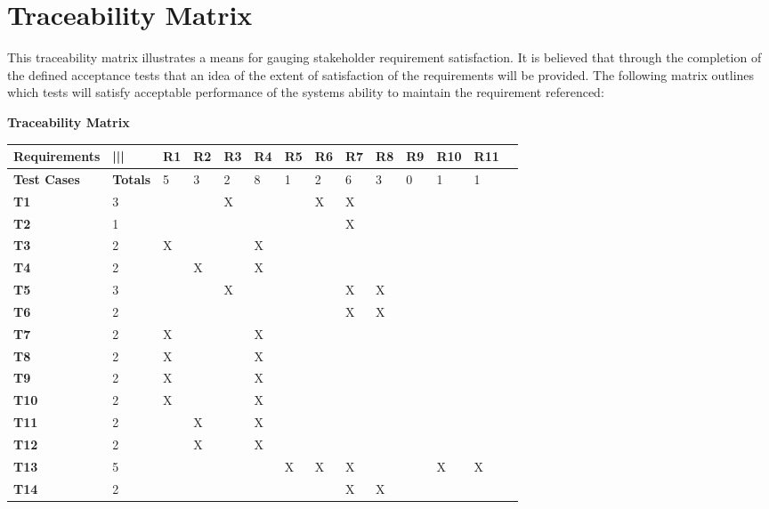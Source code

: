 \documentclass{article}
\begin{document}
\pagebreak
\section{Traceability Matrix}
This traceability matrix illustrates a means for gauging stakeholder requirement satisfaction. It is believed that through the completion of the defined acceptance tests that an idea of the extent of satisfaction of the requirements will be provided. The following matrix outlines which tests will satisfy acceptable performance of the systems ability to maintain the requirement referenced:

\begin{flushleft}
\large
{}
\textbf{Traceability Matrix}
\end{flushleft}

\begin{center}
\begin{tabular}{|l|l|l|l|l|l|l|l|l|l|l|l|l|l|}
\hline
 \textbf{Requirements} & ||| & \textbf{R1} & \textbf{R2}  & \textbf{R3} & \textbf{R4} & \textbf{R5} & \textbf{R6}  & \textbf{R7} & \textbf{R8} & \textbf{R9} & \textbf{R10} & \textbf{R11}\\ \hline
 \textbf{Test Cases} & \textbf{Totals}& 5 & 3 & 2 & 8 & 1 & 2 & 6 & 3 & 0 & 1 & 1\\ \hline
 \textbf{T1}  &  3  &     &     &  X  &     &     &  X  & X    &  &  &  &\\ \hline
 \textbf{T2}  &  1  &     &     &     &     &     &    &  X   &  &  &  & \\ \hline
 \textbf{T3}  &  2  &  X  &     &     &  X  &     &     &     &  &  &  & \\ \hline
 \textbf{T4}  &  2  &     &  X  &     &  X  &     &     &     &  &  &  &  \\ \hline
 \textbf{T5}  &  3  &     &     &  X  &     &     &    &   X     &  X  &  &  &  \\ \hline
 \textbf{T6}  &  2  &     &     &     &     &     &    &  X   & X  &  &  & \\ \hline
 \textbf{T7}  &  2  &  X  &     &     &  X  &     &     &     &  &  &  & \\ \hline
 \textbf{T8}  &  2  &  X  &     &     &  X  &     &     &     &  &  &  & \\ \hline
 \textbf{T9}  &  2  &  X  &     &     &  X  &     &     &     &  &  &  &  \\ \hline
 \textbf{T10} &  2  &  X  &     &     &  X  &     &     &     &  &  &  &   \\ \hline
 \textbf{T11} &  2  &     &  X  &     &  X  &     &     &     &  &  &  &  \\ \hline
 \textbf{T12} &  2  &     &  X  &     &  X  &     &     &     &  &  &  &  \\ \hline
 \textbf{T13} &  5  &     &     &     &     &  X  &  X  &  X  &   &   &  X  &  X \\ \hline
 \textbf{T14} &  2  &     &     &     &     &     &     &  X  &  X  &    &    &  \\ \hline
\end{tabular}
\end{center}
\end{document}
